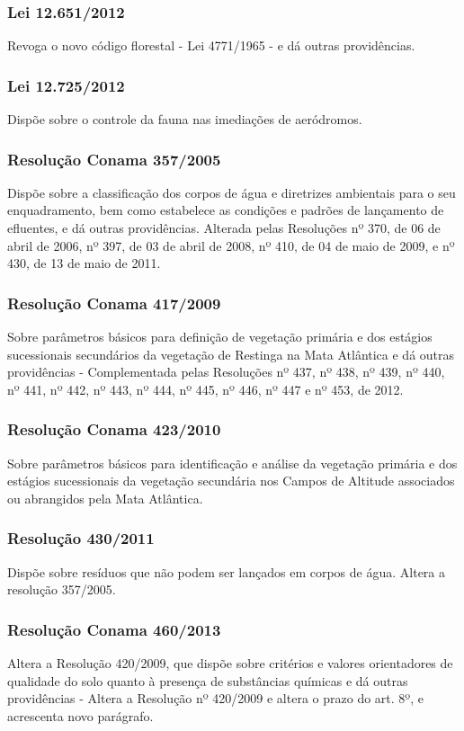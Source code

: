 \begin{subapend}
\begin{subsubapend}
		\subsubsection{Lei 12.651/2012}
		Revoga o novo código florestal - Lei 4771/1965 -  e dá outras providências.
		\subsubsection{Lei 12.725/2012}
		Dispõe sobre o controle da fauna nas imediações de aeródromos.
		\subsubsection{Resolução Conama 357/2005}
		Dispõe sobre a classificação dos corpos de água e diretrizes ambientais para o seu enquadramento, bem como estabelece as condições e padrões de lançamento de efluentes, e dá outras providências. Alterada pelas Resoluções nº 370, de 06 de abril de 2006, nº 397, de 03 de abril de 2008, nº 410, de 04 de maio de 2009, e nº 430, de 13 de maio de 2011.
		\subsubsection{Resolução Conama 417/2009}
		Sobre parâmetros básicos para definição de vegetação primária e dos estágios sucessionais secundários da vegetação de Restinga na Mata Atlântica e dá outras providências - Complementada pelas Resoluções nº 437, nº 438, nº 439, nº 440, nº 441, nº 442, nº 443, nº 444, nº 445, nº 446, nº 447 e nº 453, de 2012.
		\subsubsection{Resolução Conama 423/2010}
		Sobre parâmetros básicos para identificação e análise da vegetação primária e dos estágios sucessionais da vegetação secundária nos Campos de Altitude associados ou abrangidos pela Mata Atlântica.
		\subsubsection{Resolução 430/2011}
		Dispõe sobre resíduos que não podem ser lançados em corpos de água.  Altera a resolução 357/2005.
		\subsubsection{Resolução Conama 460/2013}
		Altera a Resolução 420/2009, que dispõe sobre critérios e valores orientadores de qualidade do solo quanto à presença de substâncias químicas e dá outras providências - Altera a Resolução  nº 420/2009 e altera o prazo do art. 8º, e acrescenta novo parágrafo.

\end{subsubapend}
\end{subapend}
